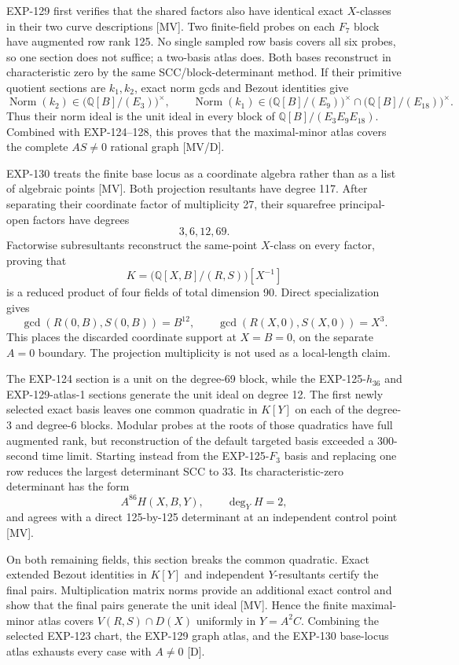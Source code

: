 \documentclass[11pt]{article}
\theoremstyle{remark}
\newcommand{\Q}{\mathbb{Q}}
\begin{document}
EXP-129 first verifies that the shared factors also have identical exact
\(X\)-classes in their two curve descriptions [MV]. Two finite-field probes
on each \(F_7\) block have augmented row rank 125. No single sampled row basis
covers all six probes, so one section does not suffice; a two-basis atlas
does. Both bases reconstruct in characteristic zero by the
same SCC/block-determinant method. If their primitive quotient sections are
\(k_1,k_2\), exact norm gcds and Bezout identities give
\[
 \operatorname{Norm}(k_2)\in
   \bigl(\Q[B]/(E_3)\bigr)^\times,
 \qquad
 \operatorname{Norm}(k_1)\in
   \bigl(\Q[B]/(E_9)\bigr)^\times
   \cap\bigl(\Q[B]/(E_{18})\bigr)^\times.
\]
Thus their norm ideal is the unit ideal in every block of
\(\Q[B]/(E_3E_9E_{18})\). Combined with \mbox{EXP-124--128}, this proves that the
maximal-minor atlas covers the complete \(AS\ne0\) rational graph [MV/D].

EXP-130 treats the finite base locus as a coordinate algebra rather than as a
list of algebraic points [MV]. Both projection resultants have degree 117.
After separating their coordinate factor of multiplicity 27, their
squarefree principal-open factors have degrees
\[
  3,6,12,69.
\]
Factorwise subresultants reconstruct the same-point \(X\)-class on every
factor, proving that
\[
 K=\bigl(\Q[X,B]/(R,S)\bigr)[X^{-1}]
\]
is a reduced product of four fields of total dimension 90. Direct
specialization gives
\[
 \gcd(R(0,B),S(0,B))=B^{12},\qquad
 \gcd(R(X,0),S(X,0))=X^3.
\]
This places the discarded coordinate support at
\(X=B=0\), on the separate \(A=0\) boundary. The projection multiplicity is
not used as a local-length claim.

The EXP-124 section is a unit on the degree-69 block, while the
\mbox{EXP-125-\(h_{36}\)} and \mbox{EXP-129-atlas-1} sections generate the unit ideal on
degree 12. The first newly selected exact basis leaves one common quadratic
in \(K[Y]\) on each of the degree-3 and degree-6 blocks. Modular probes at
the roots of those quadratics have full augmented rank, but reconstruction
of the default targeted basis exceeded a 300-second time limit. Starting
instead from the EXP-125-\(F_3\) basis and replacing one row reduces the
largest determinant SCC to 33. Its characteristic-zero determinant has
the form
\[
 A^{86}H(X,B,Y),\qquad \deg_Y H=2,
\]
and agrees with a direct 125-by-125 determinant at an independent control
point [MV].

On both remaining fields, this section breaks the common quadratic. Exact extended Bezout identities in \(K[Y]\) and independent
\(Y\)-resultants certify the final pairs. Multiplication matrix norms provide
an additional exact control and show that the
final pairs generate the unit ideal [MV]. Hence the finite maximal-minor atlas
covers \(V(R,S)\cap D(X)\) uniformly in \(Y=A^2C\). Combining the selected
EXP-123 chart, the EXP-129 graph atlas, and the EXP-130 base-locus atlas
exhausts every case with \(A\ne0\) [D].
\end{document}
